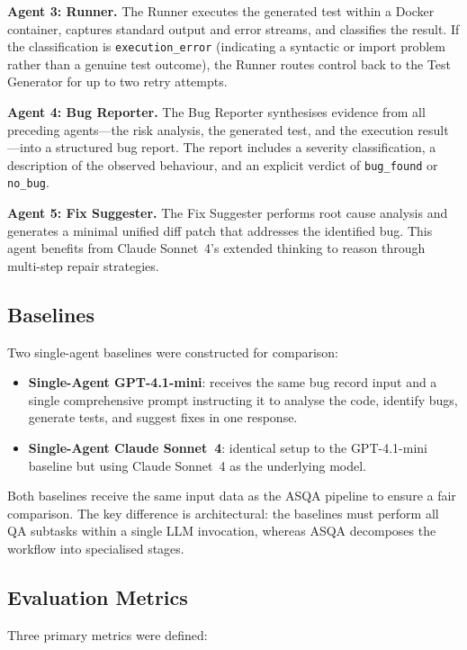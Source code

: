 \documentclass[conference]{IEEEtran}
\begin{document}
\textbf{Agent 3: Runner.} The Runner executes the generated test within a Docker container, captures standard output and error streams, and classifies the result. If the classification is \texttt{execution\_error} (indicating a syntactic or import problem rather than a genuine test outcome), the Runner routes control back to the Test Generator for up to two retry attempts.

\textbf{Agent 4: Bug Reporter.} The Bug Reporter synthesises evidence from all preceding agents---the risk analysis, the generated test, and the execution result---into a structured bug report. The report includes a severity classification, a description of the observed behaviour, and an explicit verdict of \texttt{bug\_found} or \texttt{no\_bug}.

\textbf{Agent 5: Fix Suggester.} The Fix Suggester performs root cause analysis and generates a minimal unified diff patch that addresses the identified bug. This agent benefits from Claude Sonnet~4's extended thinking to reason through multi-step repair strategies.

\subsection{Baselines}

Two single-agent baselines were constructed for comparison:

\begin{itemize}
    \item \textbf{Single-Agent GPT-4.1-mini}: receives the same bug record input and a single comprehensive prompt instructing it to analyse the code, identify bugs, generate tests, and suggest fixes in one response.
    \item \textbf{Single-Agent Claude Sonnet~4}: identical setup to the GPT-4.1-mini baseline but using Claude Sonnet~4 as the underlying model.
\end{itemize}

Both baselines receive the same input data as the ASQA pipeline to ensure a fair comparison. The key difference is architectural: the baselines must perform all QA subtasks within a single LLM invocation, whereas ASQA decomposes the workflow into specialised stages.

\subsection{Evaluation Metrics}

Three primary metrics were defined:
\end{document}
